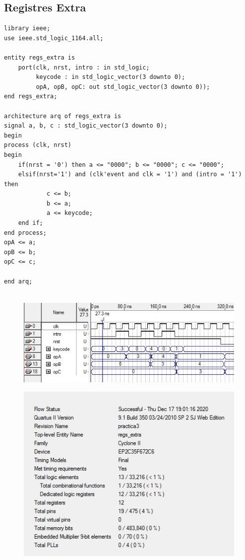 \documentclass[12pt, a4papre]{article}
\begin{document}
\subsection{Registres Extra}

	\begin{lstlisting}[style=vhdl, frame=single, basicstyle=\tiny]
	library ieee;
use ieee.std_logic_1164.all;

entity regs_extra is
	port(clk, nrst, intro : in std_logic;
		 keycode : in std_logic_vector(3 downto 0);
		 opA, opB, opC: out std_logic_vector(3 downto 0));
end regs_extra;

architecture arq of regs_extra is
signal a, b, c : std_logic_vector(3 downto 0);
begin
process (clk, nrst)
begin 
	if(nrst = '0') then a <= "0000"; b <= "0000"; c <= "0000";
	elsif(nrst='1') and (clk'event and clk = '1') and (intro = '1') then
			c <= b;
			b <= a;
			a <= keycode;
	end if;
end process;
opA <= a;
opB <= b;
opC <= c;

end arq;
	
			\end{lstlisting}
			
						\begin{figure}[H]
		\begin{center}
		\includegraphics[width=130mm]{simularioRegistreExtra.jpeg}
		\end{center}
	\end{figure}	
	
					\begin{figure}[H]
		\begin{center}
		\includegraphics[width=130mm]{informeRegsExtra.jpeg}
		\end{center}
	\end{figure}	
	
\end{document}
